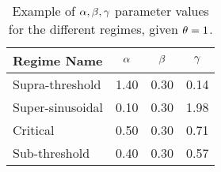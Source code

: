  
\begin{table}[ht]
\begin{center}
\begin{tabular}{l|ccc}
Regime Name & $\alpha$ & $\beta$ & ${\gamma }$ \\ \hline
Supra-threshold&1.40&0.30&0.14 \\
Super-sinusoidal&0.10&0.30&1.98 \\
Critical&0.50&0.30&0.71 \\
Sub-threshold&0.40&0.30&0.57 \\
\end{tabular}
\caption[Parameter values for model regimes]{Example of ${\alpha,\beta,{\gamma } }$ parameter values
for the different regimes, given ${ \theta} = 1$.}
\label{tab:regimes}
\end{center} 
\end{table}
